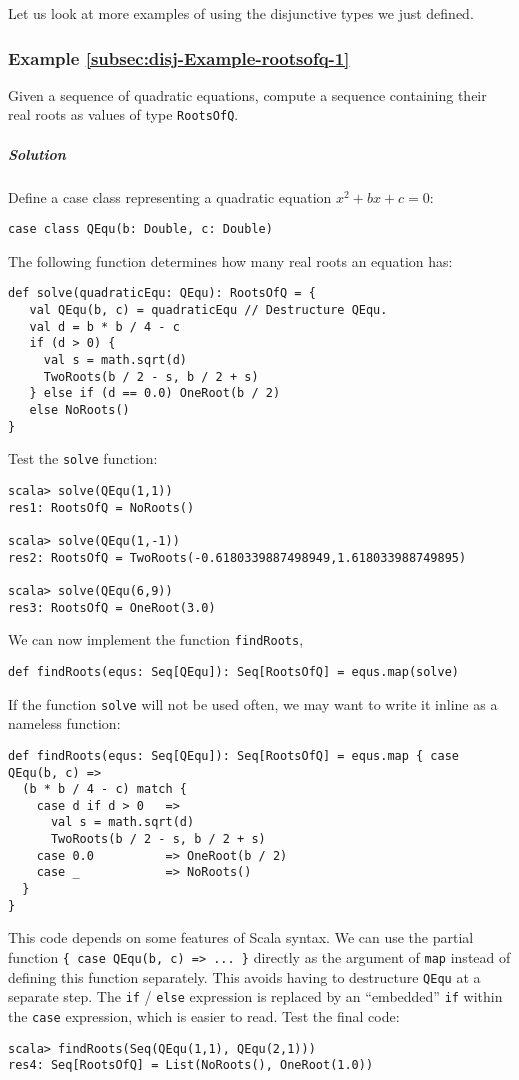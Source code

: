Let us look at more examples of using the disjunctive types we just
defined.

\subsubsection{Example \label{subsec:disj-Example-rootsofq-1}\ref{subsec:disj-Example-rootsofq-1}}

Given a sequence of quadratic equations, compute a sequence containing
their real roots as values of type \lstinline!RootsOfQ!.

\subparagraph{Solution}

Define a case class representing a quadratic equation $x^{2}+bx+c=0$:
\begin{lstlisting}
case class QEqu(b: Double, c: Double)
\end{lstlisting}
The following function determines how many real roots an equation
has:
\begin{lstlisting}
def solve(quadraticEqu: QEqu): RootsOfQ = {
   val QEqu(b, c) = quadraticEqu // Destructure QEqu.
   val d = b * b / 4 - c
   if (d > 0) {
     val s = math.sqrt(d)
     TwoRoots(b / 2 - s, b / 2 + s)
   } else if (d == 0.0) OneRoot(b / 2)
   else NoRoots()
}
\end{lstlisting}
Test the \lstinline!solve! function:
\begin{lstlisting}
scala> solve(QEqu(1,1))
res1: RootsOfQ = NoRoots()

scala> solve(QEqu(1,-1))
res2: RootsOfQ = TwoRoots(-0.6180339887498949,1.618033988749895) 

scala> solve(QEqu(6,9))
res3: RootsOfQ = OneRoot(3.0) 
\end{lstlisting}
We can now implement the function \lstinline!findRoots!,
\begin{lstlisting}
def findRoots(equs: Seq[QEqu]): Seq[RootsOfQ] = equs.map(solve)
\end{lstlisting}
If the function \lstinline!solve! will not be used often, we may
want to write it inline as a nameless function:
\begin{lstlisting}
def findRoots(equs: Seq[QEqu]): Seq[RootsOfQ] = equs.map { case QEqu(b, c) =>
  (b * b / 4 - c) match {
    case d if d > 0   =>
      val s = math.sqrt(d)
      TwoRoots(b / 2 - s, b / 2 + s)
    case 0.0          => OneRoot(b / 2)
    case _            => NoRoots()
  }
}
\end{lstlisting}
This code depends on some features of Scala syntax. We can use the
partial function \lstinline!{ case QEqu(b, c) => ... }! directly
as the argument of \lstinline!map! instead of defining this function
separately. This avoids having to destructure \lstinline!QEqu! at
a separate step. The \lstinline!if! / \lstinline!else! expression
is replaced by an \textsf{``}embedded\textsf{''} \lstinline!if!
within the \lstinline!case! expression, which is easier to read.
Test the final code:
\begin{lstlisting}
scala> findRoots(Seq(QEqu(1,1), QEqu(2,1)))
res4: Seq[RootsOfQ] = List(NoRoots(), OneRoot(1.0)) 
\end{lstlisting}


